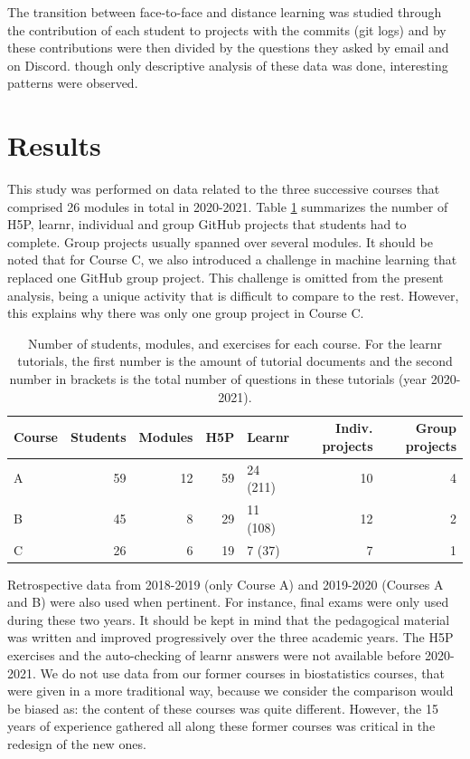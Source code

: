 \documentclass{aims}
\theoremstyle{definition}
\begin{document}
The transition between face-to-face and distance learning was studied
through the contribution of each student to projects with the commits
(git logs) and by these contributions were then divided by the questions
they asked by email and on Discord. though only descriptive analysis of
these data was done, interesting patterns were observed.

\hypertarget{results}{%
\section{Results}\label{results}}

This study was performed on data related to the three successive courses
that comprised 26 modules in total in 2020-2021. Table
\ref {tab:tab_course} summarizes the number of H5P, learnr, individual
and group GitHub projects that students had to complete. Group projects
usually spanned over several modules. It should be noted that for Course
C, we also introduced a challenge in machine learning that replaced one
GitHub group project. This challenge is omitted from the present
analysis, being a unique activity that is difficult to compare to the
rest. However, this explains why there was only one group project in
Course C.

\begin{table}

\caption{\label{tab:tab_course_summary}\label{tab:tab_course} Number of students, modules, and exercises for each course. For the learnr tutorials, the first number is the amount of tutorial documents and the second number in brackets is the total number of questions in these tutorials (year 2020-2021).}
\centering
\begin{tabular}[t]{l|r|r|r|l|r|r}
\hline
Course & Students & Modules & H5P & Learnr & Indiv. projects & Group projects\\
\hline
A & 59 & 12 & 59 & 24 (211) & 10 & 4\\
\hline
B & 45 & 8 & 29 & 11 (108) & 12 & 2\\
\hline
C & 26 & 6 & 19 & 7 (37) & 7 & 1\\
\hline
\end{tabular}
\end{table}

Retrospective data from 2018-2019 (only Course A)
\cite{Grosjeandataset2018} and 2019-2020 (Courses A and B)
\cite{Grosjeandataset2019} were also used when pertinent. For instance,
final exams were only used during these two years. It should be kept in
mind that the pedagogical material was written and improved
progressively over the three academic years. The H5P exercises and the
auto-checking of learnr answers were not available before 2020-2021. We
do not use data from our former courses in biostatistics courses, that
were given in a more traditional way, because we consider the comparison
would be biased as: the content of these courses was quite different.
However, the 15 years of experience gathered all along these former
courses was critical in the redesign of the new ones.
\end{document}
